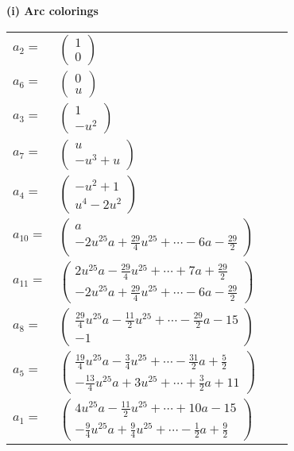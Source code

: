 \documentclass[1p]{elsarticle_modified}
\theoremstyle{definition}
\begin{document}
\flushleft \textbf{(i) Arc colorings}\\
\begin{tabular}{m{7pt} m{180pt} m{7pt} m{180pt} }
\flushright $a_{2}=$&$\begin{pmatrix}1\\0\end{pmatrix}$ \\
\flushright $a_{6}=$&$\begin{pmatrix}0\\u\end{pmatrix}$ \\
\flushright $a_{3}=$&$\begin{pmatrix}1\\- u^2\end{pmatrix}$ \\
\flushright $a_{7}=$&$\begin{pmatrix}u\\- u^3+u\end{pmatrix}$ \\
\flushright $a_{4}=$&$\begin{pmatrix}- u^2+1\\u^4-2 u^2\end{pmatrix}$ \\
\flushright $a_{10}=$&$\begin{pmatrix}a\\-2 u^{25} a+\frac{29}{4} u^{25}+\cdots-6 a-\frac{29}{2}\end{pmatrix}$ \\
\flushright $a_{11}=$&$\begin{pmatrix}2 u^{25} a-\frac{29}{4} u^{25}+\cdots+7 a+\frac{29}{2}\\-2 u^{25} a+\frac{29}{4} u^{25}+\cdots-6 a-\frac{29}{2}\end{pmatrix}$ \\
\flushright $a_{8}=$&$\begin{pmatrix}\frac{29}{4} u^{25} a-\frac{11}{2} u^{25}+\cdots-\frac{29}{2} a-15\\-1\end{pmatrix}$ \\
\flushright $a_{5}=$&$\begin{pmatrix}\frac{19}{4} u^{25} a-\frac{3}{4} u^{25}+\cdots-\frac{31}{2} a+\frac{5}{2}\\-\frac{13}{4} u^{25} a+3 u^{25}+\cdots+\frac{3}{2} a+11\end{pmatrix}$ \\
\flushright $a_{1}=$&$\begin{pmatrix}4 u^{25} a-\frac{11}{2} u^{25}+\cdots+10 a-15\\-\frac{9}{4} u^{25} a+\frac{9}{4} u^{25}+\cdots-\frac{1}{2} a+\frac{9}{2}\end{pmatrix}$ \\

\end{tabular}
\end{document}
